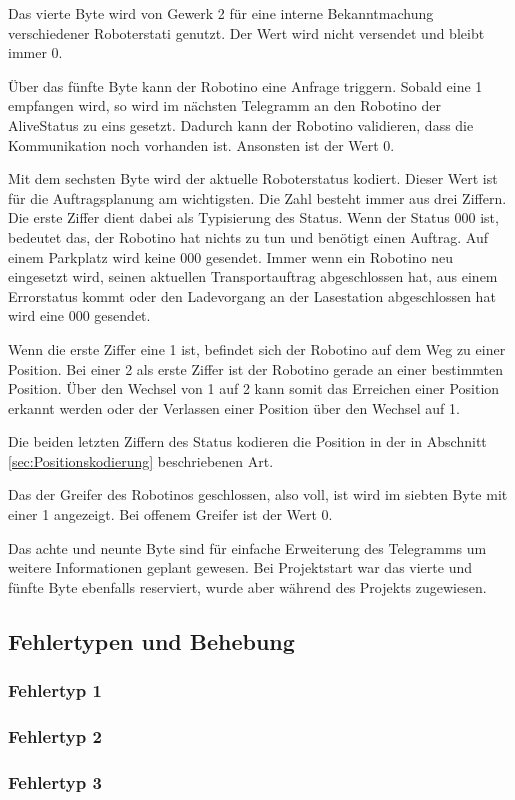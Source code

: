 Das vierte Byte wird von Gewerk 2 für eine interne Bekanntmachung verschiedener Roboterstati genutzt. Der Wert wird nicht versendet und bleibt immer 0.

Über das fünfte Byte kann der Robotino eine Anfrage triggern. Sobald eine 1 empfangen wird, so wird im nächsten Telegramm an den Robotino der AliveStatus zu eins gesetzt. Dadurch kann der Robotino validieren, dass die Kommunikation noch vorhanden ist. Ansonsten ist der Wert 0. 

Mit dem sechsten Byte wird der aktuelle Roboterstatus kodiert. Dieser Wert ist für die Auftragsplanung am wichtigsten. Die Zahl besteht immer aus drei Ziffern. Die erste Ziffer dient dabei als Typisierung des Status. Wenn der Status 000 ist, bedeutet das, der Robotino hat nichts zu tun und benötigt einen Auftrag. Auf einem Parkplatz wird keine 000 gesendet. Immer wenn ein Robotino neu eingesetzt wird, seinen aktuellen Transportauftrag abgeschlossen hat, aus einem Errorstatus kommt oder den Ladevorgang an der Lasestation abgeschlossen hat wird eine 000 gesendet. 

Wenn die erste Ziffer eine 1 ist, befindet sich der Robotino auf dem Weg zu einer Position. Bei einer 2 als erste Ziffer ist der Robotino gerade an einer bestimmten Position. Über den Wechsel von 1 auf 2 kann somit das Erreichen einer Position erkannt werden oder der Verlassen einer Position über den Wechsel auf 1. 

Die beiden letzten Ziffern des Status kodieren die Position in der in Abschnitt \ref{sec:Positionskodierung} beschriebenen Art. 

Das der Greifer des Robotinos geschlossen, also voll, ist wird im siebten Byte mit einer 1 angezeigt. Bei offenem Greifer ist der Wert 0.

Das achte und neunte Byte sind für einfache Erweiterung des Telegramms um weitere Informationen geplant gewesen. Bei Projektstart war das vierte und fünfte Byte ebenfalls reserviert, wurde aber während des Projekts zugewiesen. 

\subsection{Fehlertypen und Behebung}
\label{sec:Error}

\subsubsection{Fehlertyp 1}
\subsubsection{Fehlertyp 2}
\subsubsection{Fehlertyp 3}
